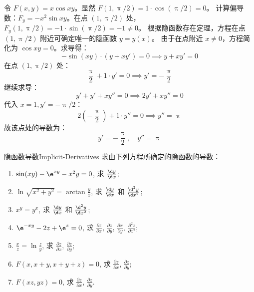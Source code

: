 \begin{solution}
    令 $F(x, y) = x \cos xy$。显然 $F(1, \uppi/2) = 1 \cdot \cos(\uppi/2) = 0$。
    计算偏导数：$F_y = -x^2 \sin xy$。在点 $(1, \uppi/2)$ 处，$F_y(1, \uppi/2) = -1 \cdot \sin(\uppi/2) = -1 \neq 0$。
    根据隐函数存在定理，方程在点 $(1, \uppi/2)$ 附近可确定唯一的隐函数 $y = y(x)$。
    由于在点附近 $x \neq 0$，方程简化为 $\cos xy = 0$。求导得：
    \begin{equation}
        -\sin(xy) \cdot (y + x y') = 0 \implies y + x y' = 0
    \end{equation}
    在点 $(1, \uppi/2)$ 处：
    \begin{equation}
        \frac{\uppi}{2} + 1 \cdot y' = 0 \implies y' = -\frac{\uppi}{2}
    \end{equation}
    继续求导：
    \begin{equation}
        y' + y' + x y'' = 0 \implies 2y' + x y'' = 0
    \end{equation}
    代入 $x=1, y'=-\uppi/2$：
    \begin{equation}
        2\left(-\frac{\uppi}{2}\right) + 1 \cdot y'' = 0 \implies y'' = \uppi
    \end{equation}
    故该点处的导数为：
    \begin{equation}
        \boxed{y' = -\frac{\uppi}{2}, \quad y'' = \uppi}
    \end{equation}
\end{solution}

\begin{problem}{隐函数导数}{Implicit-Derivatives}
    求由下列方程所确定的隐函数的导数：
    \begin{enumerate}
        \item $\sin(xy) - \e^{xy} - x^2 y = 0$, 求 $\frac{\d y}{\d x}$;
        \item $\ln \sqrt{x^2 + y^2} = \arctan \frac{y}{x}$, 求 $\frac{\d y}{\d x}$ 和 $\frac{\d^2 y}{\d x^2}$;
        \item $x^y = y^x$, 求 $\frac{\d y}{\d x}$ 和 $\frac{\d^2 y}{\d x^2}$;
        \item $\e^{-xy} - 2z + \e^z = 0$, 求 $\frac{\partial z}{\partial x}$, $\frac{\partial z}{\partial y}$, $\frac{\partial x}{\partial y}$, $\frac{\partial^2 z}{\partial x^2}$;
        \item $\frac{x}{z} = \ln \frac{z}{y}$, 求 $\frac{\partial z}{\partial x}$, $\frac{\partial z}{\partial y}$;
        \item $F(x, x+y, x+y+z) = 0$, 求 $\frac{\partial z}{\partial x}$, $\frac{\partial z}{\partial y}$;
        \item $F(xz, yz) = 0$, 求 $\frac{\partial z}{\partial x}$, $\frac{\partial z}{\partial y}$.
    \end{enumerate}
\end{problem}

